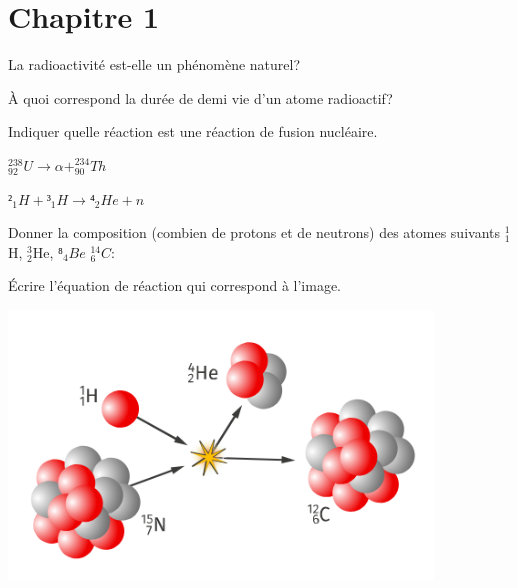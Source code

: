 \documentclass[11pt]{exam}		%
\title{\Titre}
\newcommand{\Titre}{Chapitre 1} %
\begin{document}
\thispagestyle{headandfoot}

\section{\Titre} %

\headrule
\footrule
\setlength{\columnsep}{0.25cm}
\setlength{\columnseprule}{1pt}

\consignes


\begin{questions}
	\question[1] La radioactivité est-elle un phénomène naturel?

	\question[1] À quoi correspond la durée de demi vie d'un atome radioactif?

	\question[1 \half] Indiquer quelle réaction est une réaction de fusion nucléaire.

	\begin{center}
		\begin{minipage}[c]{0.4\textwidth}
			\centering $^{238}_{92}U \rightarrow \alpha + ^{234}_{90}Th $
		\end{minipage}
		\hspace{0.1\textwidth}
		\begin{minipage}[c]{0.4\textwidth}
			\centering $ ²_1H + ³_1H → ⁴_2He + n $
		\end{minipage}
	\end{center} \vspace{10pt}

	\question[2] Donner la composition (combien de protons et de neutrons) des atomes suivants $^1_1$H, \hspace{5pt} $^3_2$He, \hspace{5pt} $⁸_4Be$ \hspace{5pt} $^{14}_6C$:

	\question[1\half] Écrire l'équation de réaction qui correspond à l'image.

	\begin{center}
		\includegraphics[scale=0.4]{r1.png}
	\end{center}


\end{questions}
\end{document}
